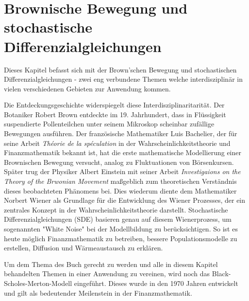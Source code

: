 %
%
%
%
\chapter{Brownische Bewegung und stochastische Differenzialgleichungen\label{chapter:brown}}
\begin{refsection}


Dieses Kapitel befasst sich mit der Brown'schen Bewegung und stochastischen Differenzialgleichungen - zwei eng verbundene Themen welche interdisziplinär in vielen verschiedenen Gebieten zur Anwendung kommen.

Die Entdeckungsgeschichte widerspiegelt diese Interdisziplinaritarität. Der Botaniker Robert Brown entdeckte im 19. Jahrhundert, dass in Flüssigkeit suspendierte Pollenteilchen unter seinem Mikroskop scheinbar zufällige Bewegungen ausführen. Der französische Mathematiker Luis Bachelier, der für seine Arbeit \glqq \textit{Théorie de la spéculation}\glqq{} in der Wahrscheinlichkeitstheorie und Finanzmathematik bekannt ist, hat die erste mathematische Modellierung einer Brownischen Bewegung versucht, analog zu Fluktuationen von Börsenkursen. Später trug der Physiker Albert Einstein mit seiner Arbeit \glqq \textit{Investigaions on the Theory of the Brwonian Movement}\glqq{} maßgeblich zum theoretischen Verständnis dieses beobachteten Phänomens bei. Dies wiederum diente dem Mathematiker Norbert Wiener als Grundlage für die Entwicklung des Wiener Prozesses, der ein zentrales Konzept in der Wahrscheinlichkeitstheorie darstellt. Stochastische Differenzialgleichungen (SDE) basieren genau auf diesem Wienerprozess, um sogenannten "White Noise"  bei der Modellbildung zu berücksichtigen. So ist es heute möglich Finanzmathematik zu betreiben, bessere Populationsmodelle zu erstellen, Diffusion und Wärmeaustausch zu erklären.


Um dem Thema des Buch gerecht zu werden und alle in diesem Kapitel behandelten Themen in einer Anwendung zu vereinen, wird noch das Black-Scholes-Merton-Modell eingeführt. Dieses wurde in den 1970 Jahren entwickelt und gilt als bedeutender Meilenstein in der Finanzmathematik.







\printbibliography[heading=subbibliography]
\end{refsection}
